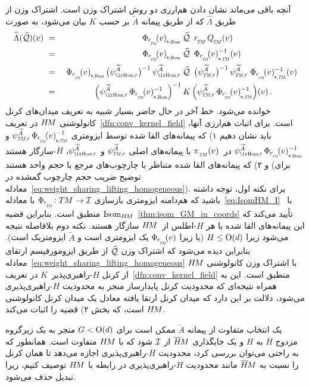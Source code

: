 آنچه باقی می‌ماند نشان دادن هم‌ارزی دو روش اشتراک وزن است.
اشتراک وزن از طریق $\widehat{\Lambda}$ که از طریق پیمانه $\widetilde{A}$ بر حسب $K$ بیان می‌شود، به صورت
\begin{alignat}{3}\label{eq:weight_sharing_lifting_homogeneous}
	\widehat{\Lambda}(\Qhat)(v)
	\ &=&\ \dPhirHom{v}\; &\Qhat\,\ \rTM\, \QTM (v) \notag \\
	\ &=&\ \dPhirHom{v}\; &\Qhat\,\ \dPhirTM{v}^{-1}(v) \notag \\
	\ &=&\ \dPhirHom{v}\, \big(\psiHomr^{\widetilde{A}}\big)^{-1}\, \psiHomr^{\widetilde{A}}\; &\Qhat\,\ \big(\psiTMr^{\widetilde{A}}\big)^{-1}\, \psiTMr^{\widetilde{A}}\; \dPhirTM{v}^{-1}(v) \notag \\
	\ &=&\ \Big( \psiHomr^{\widetilde{A}}\, \dPhirHom{v}^{-1} \Big)^{-1}\, &K\, \Big( \psiTMr^{\widetilde{A}}\, \dPhirTM{v}^{-1} \Big)(v) \,.
\end{alignat}
خوانده می‌شود. خط آخر در حال حاضر بسیار شبیه به تعریف میدان‌های کرنل کانولوشنی $H\mkern-2.5muM$ در تعریف~\ref{dfn:conv_kernel_field} است.
برای اثبات هم‌ارزی آنها، باید نشان دهیم
۱) که پیمانه‌های القا شده توسط ایزومتری 
$\psiTMr^{\widetilde{A}}\, \dPhirTM{v}^{-1}$ و $\psiHomr^{\widetilde{A}}\, \dPhirHom{v}^{-1}$ در~$\piTM(v)$
با پیمانه‌های اصلی $\psiTMr^{\widetilde{A}}$ و $\psiHomr^{\widetilde{A}}$، $H$-سازگار هستند و
۲) که پیمانه‌های القا شده متناظر با چارچوب‌های مرجع با حجم واحد هستند (برای توضیح ضریب حجم چارچوب گمشده در معادله~\eqref{eq:weight_sharing_lifting_homogeneous}).
برای نکته اول، توجه داشته باشید که هم‌دامنه ایزومتری بازسازی $\PhirNoArg: \TM \to \I$ با معادله~\eqref{eq:IsomHM_I} با~$\operatorname{Isom}_{H\mkern-2.5muM}$ منطبق است.
بنابراین قضیه~\ref{thm:isom_GM_in_coords} تأیید می‌کند که این پیمانه‌های القا شده با هر $H$-اطلس از~$H\mkern-2.5muM$ سازگار هستند.
نکته دوم بلافاصله نتیجه می‌شود زیرا $H \leq \operatorname{O}(d)$ (یا زیرا $\Phir{v}$ یک ایزومتری است و $\widetilde{A}$ ایزومتریک است).
بنابراین دیده می‌شود که اشتراک وزن $\widehat{\mathcal{Q}}$ از طریق ایزومورفیسم ارتقای معادله~\ref{eq:weight_sharing_lifting_homogeneous} با اشتراک وزن کانولوشنی $H\mkern-2.5muM$ از کرنل $H$-راهبری‌پذیر~$K$ در تعریف~\ref{dfn:conv_kernel_field} منطبق است.
این به همراه نتیجه‌ای که محدودیت کرنل پایدارساز منجر به محدودیت $H$-راهبری‌پذیری می‌شود، دلالت بر این دارد که میدان کرنل ارتقا یافته معادل یک میدان کرنل کانولوشنی $H\mkern-2.5muM$ است، که بخش ۲) قضیه را اثبات می‌کند.







یک انتخاب متفاوت از پیمانه $\widetilde{A}$ ممکن است برای $G<\operatorname{O}(d)$ منجر به یک زیرگروه مزدوج $\overline{H}$ به $H$ و یک جایگذاری $\overline{H}\mkern-2muM$ از $\mathcal{I}$ شود که با $H\mkern-2.5muM$ متفاوت است.
همانطور که به راحتی می‌توان بررسی کرد، محدودیت $\overline{H}$-راهبری‌پذیری اجازه می‌دهد تا همان کرنل را نسبت به $\overline{H}\mkern-2muM$ مانند محدودیت $H$-راهبری‌پذیری در رابطه با $H\mkern-2.5muM$ توصیف کنیم، زیرا تبدیل حذف می‌شود.